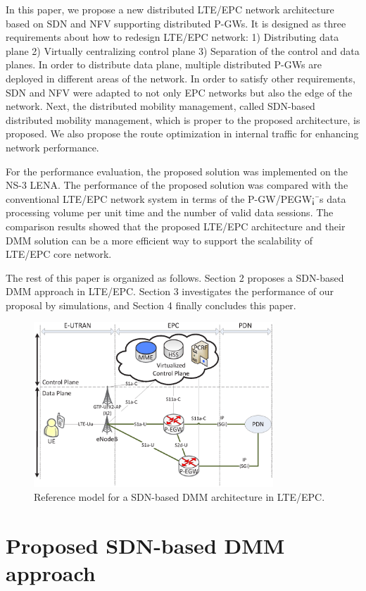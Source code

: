 \documentclass[runningheads,a4paper]{llncs}
\begin{document}
In this paper, we propose a new distributed LTE/EPC network architecture based on SDN and NFV supporting distributed P-GWs. It is designed as three requirements about how to redesign LTE/EPC network: 1) Distributing data plane 2) Virtually centralizing control plane 3) Separation of the control and data planes. In order to distribute data plane, multiple distributed P-GWs are deployed in different areas of the network. In order to satisfy other requirements, SDN and NFV were adapted to not only EPC networks but also the edge of the network. Next, the distributed mobility management, called SDN-based distributed mobility management, which is proper to the proposed architecture, is proposed. We also propose the route optimization in internal traffic for enhancing network performance.

For the performance evaluation, the proposed solution was implemented on the NS-3 LENA. The performance of the proposed solution was compared with the conventional LTE/EPC network system in terms of the P-GW/PEGW¡¯s data processing volume per unit time and the number of valid data sessions. The comparison results showed that the proposed LTE/EPC architecture and their DMM solution can be a more efficient way to support the scalability of LTE/EPC core network.

The rest of this paper is organized as follows. Section 2 proposes a SDN-based DMM approach in LTE/EPC. Section 3 investigates the performance of our proposal by simulations, and Section 4 finally concludes this paper.

\begin{figure}[t]
\begin{center}
\includegraphics[width=9cm]{figures/fig1.eps}
\end{center}
\caption{Reference model for a SDN-based DMM architecture in LTE/EPC.}
\label{fig:f1}
\end{figure}


\section{Proposed SDN-based DMM approach}
\end{document}
